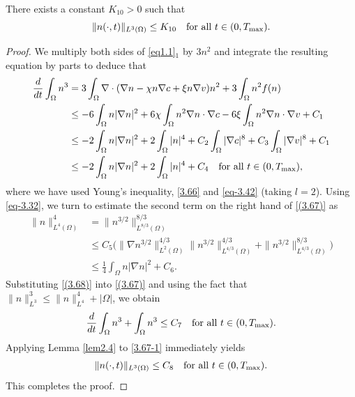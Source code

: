 \documentclass[reqno]{amsart}
\begin{document}
\begin{lemma}\label{lem3.9}
There exists a constant $K_{10}> 0 $ such that
\begin{equation}\label{9.12-7}
\|n(\cdot,t)\|_{L^3(\Omega)} \leq K_{10} \quad \text{for all } t \in (0, T_{\rm max}).
\end{equation}
\end{lemma}

\begin{proof} 
We multiply both sides of \eqref{eq1.1}$_1$ by $3n^2$ and integrate the resulting 
equation by parts to deduce that
\begin{equation}\label{(3.67)}
\begin{aligned}
\frac{d}{dt} \int_{\Omega} n^3 &= 3 \int_{\Omega} \nabla 
 \cdot  ( \nabla n - \chi n \nabla c + \xi n \nabla v) n^2 
 + 3 \int_{\Omega} n^2 f(n) \\
&\leq -6 \int_{\Omega} n |\nabla n|^2 + 6\chi \int_{\Omega} n^2 \nabla n 
\cdot \nabla c -6\xi \int_{\Omega} n^2 \nabla n \cdot \nabla v + C_1 \\
&\leq -2 \int_{\Omega} n |\nabla n|^2 + 2\int_{\Omega} |n|^4 
 + C_2 \int_{\Omega} |\nabla c|^8 + C_3 \int_{\Omega} |\nabla v|^8 + C_1 \\
&\leq -2 \int_{\Omega} n |\nabla n|^2 + 2\int_{\Omega} |n|^4 
 + C_4 \quad \text{for all } t \in (0, T_{\rm max}),
\end{aligned}
\end{equation}
where we have used Young's inequality, \eqref{3.66}  and \eqref{eq-3.42} 
(taking $l = 2$). Using \eqref{eq-3.32}, we turn to estimate the second term on
the right hand of \eqref{(3.67)} as
\begin{equation}\label{(3.68)}
\begin{aligned}
\| n \|_{L^4(\Omega)}^4
&= \| n^{3/2} \|_{L^{8/3}(\Omega)}^{8/3}\\
&\leq C_5\Big( \| \nabla n^{3/2} \|_{L^2(\Omega)}^{4/3} \|
 n^{3/2} \|_{L^{4/3}(\Omega)}^{4/3}
+ \| n^{3/2} \|_{L^{4/3}(\Omega)}^{8/3}\Big) \\
&\leq \frac{1}{4}\int_{\Omega} n |\nabla n|^2 + C_6.
\end{aligned}
\end{equation}
Substituting \eqref{(3.68)} into \eqref{(3.67)} and using the fact that 
$\|n\|^3_{L^3}\leq \|n\|^4_{L^4}+|\Omega|$, we obtain
\begin{equation}\label{3.67-1}
\begin{aligned}
\frac{d}{dt} \int_{\Omega} n^3 +\int_{\Omega} n^3\leq C_7  \quad \text{for all } 
t \in (0, T_{\rm max}).
\end{aligned}
\end{equation}
Applying Lemma \ref{lem2.4} to \eqref{3.67-1} immediately yields 
\begin{equation}\label{(3.69)}
\begin{aligned}
\| n(\cdot, t) \|_{L^3(\Omega)} \leq C_8 \quad \text{for all } t \in (0, T_{\rm max}).
\end{aligned}
\end{equation}
This completes the proof. 
\end{proof}
\end{document}

